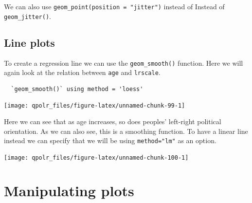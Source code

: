 \documentclass[12pt,oneside]{reedthesis}
\theoremstyle{definition}
\theoremstyle{definition}
\theoremstyle{definition}
\theoremstyle{remark}
\begin{document}
  We can also use \texttt{geom\_point(position\ =\ "jitter")} instead of
  Instead of \texttt{geom\_jitter()}.
  
  \subsection{Line plots}\label{line-plots}
  
  To create a regression line we can use the \texttt{geom\_smooth()}
  function. Here we will again look at the relation between \texttt{age}
  and \texttt{lrscale}.
  \begin{Shaded}
  \begin{Highlighting}[]
  \NormalTok{(}\OperatorTok{+}
  \StringTok{  }\NormalTok{()}
  \end{Highlighting}
  \end{Shaded}
  \begin{verbatim}
  `geom_smooth()` using method = 'loess'
  \end{verbatim}
  \begin{center}\texttt{[image: qpolr\_files/figure-latex/unnamed-chunk-99-1]} \end{center}
  
  Here we can see that as age increases, so does peoples' left-right
  political orientation. As we can also see, this is a smoothing function.
  To have a linear line instead we can specify that we will be using
  \texttt{method="lm"} as an option.
  \begin{Shaded}
  \begin{Highlighting}[]
  \NormalTok{(}\OperatorTok{+}
  \StringTok{  }\NormalTok{(}\NormalTok{)}
  \end{Highlighting}
  \end{Shaded}
  \begin{center}\texttt{[image: qpolr\_files/figure-latex/unnamed-chunk-100-1]} \end{center}
  
  \section{Manipulating plots}\label{manipulating-plots}
  
\end{document}

